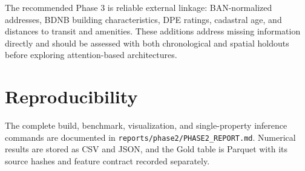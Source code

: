 \documentclass[11pt,a4paper]{article}
\begin{document}
The recommended Phase 3 is reliable external linkage: BAN-normalized addresses,
BDNB building characteristics, DPE ratings, cadastral age, and distances to
transit and amenities. These additions address missing information directly and
should be assessed with both chronological and spatial holdouts before exploring
attention-based architectures.

\section{Reproducibility}
The complete build, benchmark, visualization, and single-property inference
commands are documented in \texttt{reports/phase2/PHASE2\_REPORT.md}. Numerical
results are stored as CSV and JSON, and the Gold table is Parquet with its source
hashes and feature contract recorded separately.
\end{document}
